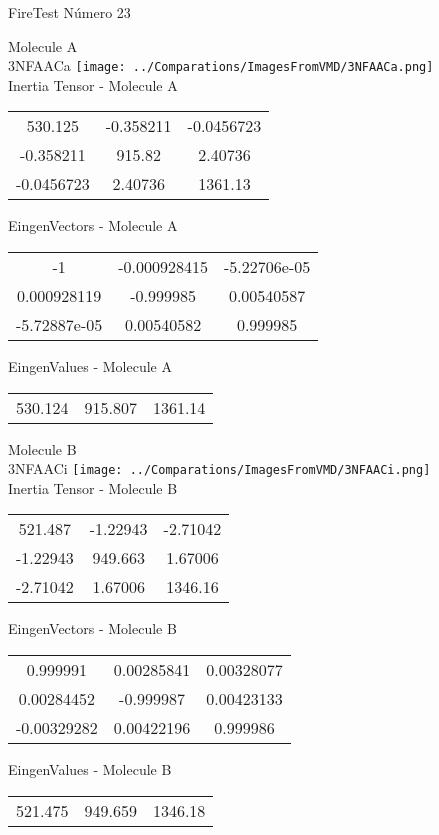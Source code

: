 \vtab[-2cm]
\begin{center}
{\large FireTest \tab Número 23}
\end{center}
\begin{multicols}{2}
\begin{center}

Molecule A \\ 
3NFAACa
\texttt{[image: ../Comparations/ImagesFromVMD/3NFAACa.png]}
\\
Inertia Tensor - Molecule A \\
\vtab

\begin{tabular}{|c c c|}
530.125	 & 	-0.358211	 & 	-0.0456723	 \\
-0.358211	 & 	915.82	 & 	2.40736	 \\
-0.0456723	 & 	2.40736	 & 	1361.13
\end{tabular}

\vtab
 EingenVectors - Molecule A     \\
\vtab
\begin{tabular}{|c c c|}
-1	 & 	-0.000928415	 & 	-5.22706e-05	 \\
0.000928119	 & 	-0.999985	 & 	0.00540587	 \\
-5.72887e-05	 & 	0.00540582	 & 	0.999985
\end{tabular}

\vtab
 EingenValues - Molecule A     \\
\vtab
\begin{tabular}{|c c c|}
530.124	 & 	915.807	 & 	1361.14	 \\
\end{tabular}
\columnbreak

Molecule B \\ 
3NFAACi
\texttt{[image: ../Comparations/ImagesFromVMD/3NFAACi.png]}
\\
Inertia Tensor - Molecule B \\
\vtab

\begin{tabular}{|c c c|}
521.487	 & 	-1.22943	 & 	-2.71042	 \\
-1.22943	 & 	949.663	 & 	1.67006	 \\
-2.71042	 & 	1.67006	 & 	1346.16
\end{tabular}

\vtab
 EingenVectors - Molecule B     \\
\vtab
\begin{tabular}{|c c c|}
0.999991	 & 	0.00285841	 & 	0.00328077	 \\
0.00284452	 & 	-0.999987	 & 	0.00423133	 \\
-0.00329282	 & 	0.00422196	 & 	0.999986
\end{tabular}

\vtab
 EingenValues - Molecule B     \\
\vtab
\begin{tabular}{|c c c|}
521.475	 & 	949.659	 & 	1346.18	 \\
\end{tabular}

\end{center}
\end{multicols}
